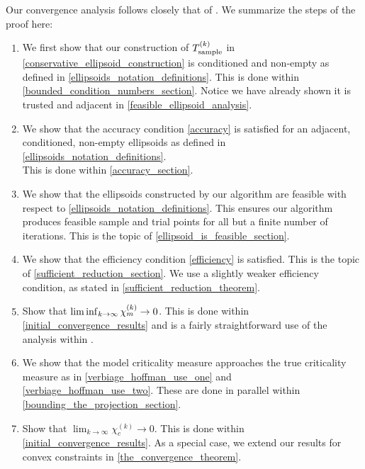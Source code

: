 

Our convergence analysis follows closely that of \cite{Conejo:2013:GCT:2620806.2621814}.
We summarize the steps of the proof here:
\begin{enumerate}
\item We first show that our construction of ${T_{\text{sample}}^{(k)}}$ in \cref{conservative_ellipsoid_construction} is conditioned and non-empty as defined in \cref{ellipsoids_notation_definitions}.
This is done within \cref{bounded_condition_numbers_section}.
Notice we have already shown it is trusted and adjacent in \cref{feasible_ellipsoid_analysis}.
\item We show that the accuracy condition \cref{accuracy} is satisfied for an adjacent, conditioned, non-empty ellipsoids as defined in \cref{ellipsoids_notation_definitions}. \\
This is done within \cref{accuracy_section}.
\item We show that the ellipsoids constructed by our algorithm are feasible with respect to \cref{ellipsoids_notation_definitions}.
This ensures our algorithm produces feasible sample and trial points for all but a finite number of iterations.
This is the topic of \cref{ellipsoid_is_feasible_section}.
\item We show that the efficiency condition \cref{efficiency} is satisfied.
This is the topic of \cref{sufficient_reduction_section}.
We use a slightly weaker efficiency condition, as stated in \cref{sufficient_reduction_theorem}.
\item Show that $\liminf_{k\to\infty} {\chi_m^{(k)}} \to 0$.
This is done within \cref{initial_convergence_results} and is a fairly straightforward use of the analysis within \cite{Conejo:2013:GCT:2620806.2621814}.
\item We show that the model criticality measure approaches the true criticality measure as in \cref{verbiage_hoffman_use_one} and \cref{verbiage_hoffman_use_two}.
These are done in parallel within \cref{bounding_the_projection_section}.
\item Show that $\lim_{k\to\infty} \chi_c^{(k)} \to 0$.
This is done within \cref{initial_convergence_results}.
As a special case, we extend our results for convex constraints in \cref{the_convergence_theorem}.


\end{enumerate}
